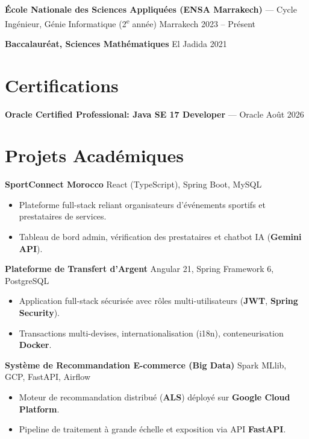 \documentclass[10pt,a4paper]{article}
\begin{document}
\textbf{École Nationale des Sciences Appliquées (ENSA Marrakech)} — Cycle Ingénieur, Génie Informatique (2\textsuperscript{e} année)
\hfill Marrakech \textbar{} 2023 -- Présent

\textbf{Baccalauréat, Sciences Mathématiques}
\hfill El Jadida \textbar{} 2021

\section*{Certifications}

\textbf{Oracle Certified Professional: Java SE 17 Developer} — Oracle
\hfill Août 2026

\section*{Projets Académiques}

\textbf{SportConnect Morocco}
\hfill React (TypeScript), Spring Boot, MySQL

\begin{itemize}
  \item Plateforme full-stack reliant organisateurs d'événements sportifs et prestataires de services.
  \item Tableau de bord admin, vérification des prestataires et chatbot IA (\textbf{Gemini API}).
\end{itemize}

\textbf{Plateforme de Transfert d'Argent}
\hfill Angular 21, Spring Framework 6, PostgreSQL

\begin{itemize}
  \item Application full-stack sécurisée avec rôles multi-utilisateurs (\textbf{JWT}, \textbf{Spring Security}).
  \item Transactions multi-devises, internationalisation (i18n), conteneurisation \textbf{Docker}.
\end{itemize}

\textbf{Système de Recommandation E-commerce (Big Data)}
\hfill Spark MLlib, GCP, FastAPI, Airflow

\begin{itemize}
  \item Moteur de recommandation distribué (\textbf{ALS}) déployé sur \textbf{Google Cloud Platform}.
  \item Pipeline de traitement à grande échelle et exposition via API \textbf{FastAPI}.
\end{itemize}
\end{document}
